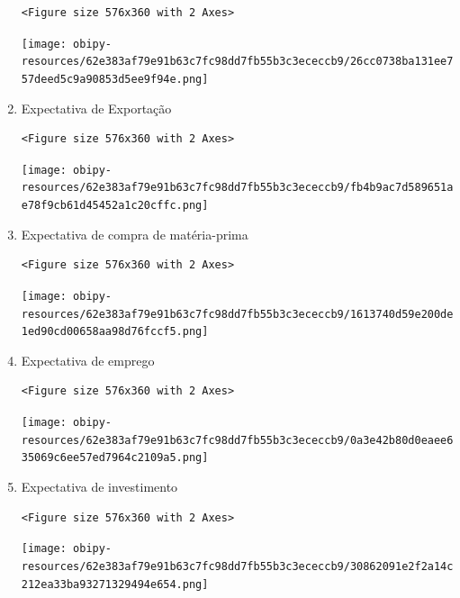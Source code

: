 \documentclass[11pt]{article}
\begin{document}
\begin{enumerate}
\begin{verbatim}
<Figure size 576x360 with 2 Axes>
\end{verbatim}


\begin{center}
\texttt{[image: obipy-resources/62e383af79e91b63c7fc98dd7fb55b3c3ececcb9/26cc0738ba131ee757deed5c9a90853d5ee9f94e.png]}
\end{center}

\item Expectativa de Exportação
\label{sec:org57f8263}

\begin{verbatim}
<Figure size 576x360 with 2 Axes>
\end{verbatim}


\begin{center}
\texttt{[image: obipy-resources/62e383af79e91b63c7fc98dd7fb55b3c3ececcb9/fb4b9ac7d589651ae78f9cb61d45452a1c20cffc.png]}
\end{center}

\item Expectativa de compra de matéria-prima
\label{sec:orgb91b58f}


\begin{verbatim}
<Figure size 576x360 with 2 Axes>
\end{verbatim}


\begin{center}
\texttt{[image: obipy-resources/62e383af79e91b63c7fc98dd7fb55b3c3ececcb9/1613740d59e200de1ed90cd00658aa98d76fccf5.png]}
\end{center}

\item Expectativa de emprego
\label{sec:orgf0945fa}

\begin{verbatim}
<Figure size 576x360 with 2 Axes>
\end{verbatim}


\begin{center}
\texttt{[image: obipy-resources/62e383af79e91b63c7fc98dd7fb55b3c3ececcb9/0a3e42b80d0eaee635069c6ee57ed7964c2109a5.png]}
\end{center}

\item Expectativa de investimento
\label{sec:org7d5de18}

\begin{verbatim}
<Figure size 576x360 with 2 Axes>
\end{verbatim}


\begin{center}
\texttt{[image: obipy-resources/62e383af79e91b63c7fc98dd7fb55b3c3ececcb9/30862091e2f2a14c212ea33ba93271329494e654.png]}
\end{center}


\end{enumerate}
\end{document}
